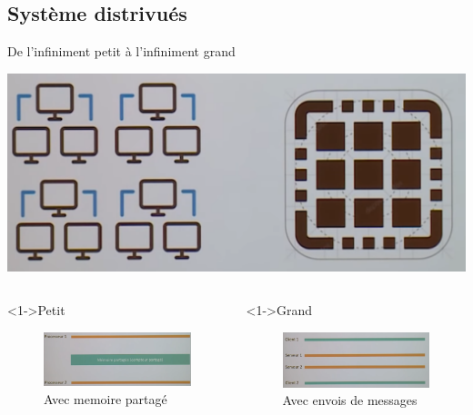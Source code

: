 \documentclass[presentation]{beamer}
\begin{document}
\subsection{Système distrivués}
\label{sec:org2880269}
\begin{frame}[label={sec:org35ec938}]{De l'infiniment petit à l'infiniment grand}
\begin{center}
\includegraphics[width=.6\textwidth]{Images/grand_petit.png}
\end{center}

\begin{columns}
\begin{column}{0.46\columnwidth}
\begin{block}<1->{Petit}
\begin{figure}[htbp]
\centering
\includegraphics[width=.8\textwidth]{Images/memoire_partagee.png}
\caption{Avec memoire partagé}
\end{figure}
\end{block}
\end{column}


\begin{column}{0.46\columnwidth}
\begin{block}<1->{Grand}
\begin{figure}[htbp]
\centering
\includegraphics[width=.8\textwidth]{Images/envoi_message.png}
\caption{Avec envois de messages}
\end{figure}
\end{block}
\end{column}
\end{columns}
\end{frame}
\end{document}
